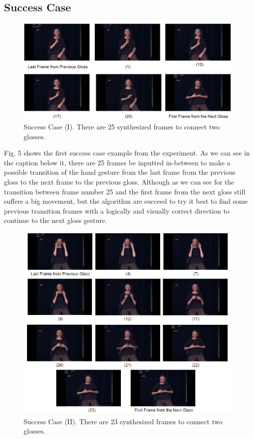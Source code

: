 \documentclass{sig-alternate-05-2015}
\begin{document}
\subsection{Success Case}
\begin{figure}
	\centering
	\includegraphics[width=\linewidth]{img/success.png}
	\caption{Success Case (I). There are 25 synthesized frames to connect two glosses.}
\end{figure}

Fig. 5 shows the first success case example from the experiment. As we can see in the caption below it, there are 25 frames be inputted in-between to make a possible transition of the hand gesture from the last frame from the previous gloss to the next frame to the previous gloss. Although as we can see for the transition between frame number 25 and the first frame from the next gloss still suffers a big movement, but the algorithm are succeed to try it best to find some previous transition frames with a logically and visually correct direction to continue to the next gloss gesture.

\begin{figure}
	\centering
	\includegraphics[width=\linewidth]{img/success1.png}
	\caption{Success Case (II). There are 23 synthesized frames to connect two glosses.}
\end{figure}
\end{document}
